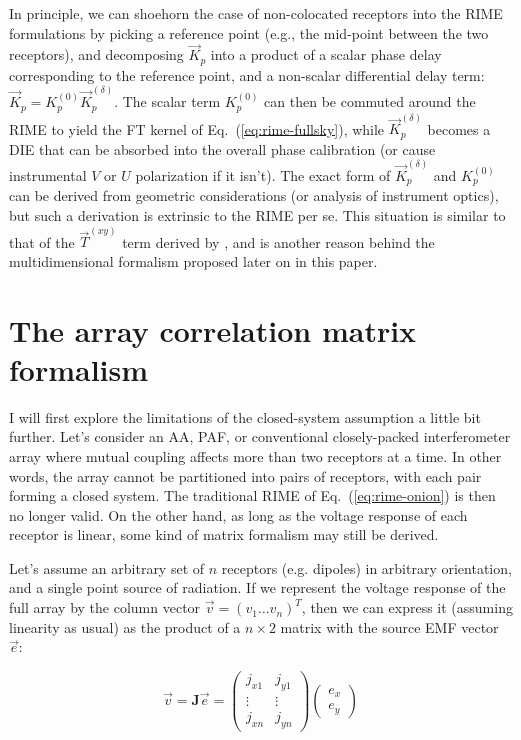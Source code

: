 \documentclass{aa}
\newcommand{\jones}[2]{\vec {#1}_{#2}}
\begin{document}
In principle, we can shoehorn the case of non-colocated receptors into the RIME formulations by picking a reference point (e.g., the  mid-point between the two receptors), and decomposing $\jones{K}{p}$ into a product of a scalar phase delay corresponding to the reference point, and a non-scalar differential delay term: $\jones{K}{p}=K_p^{(0)}\jones{K}{p}^{(\delta)}.$ The scalar term $K_p^{(0)}$ can then be commuted around the RIME to yield the FT kernel of Eq.~(\ref{eq:rime-fullsky}), while $\jones{K}{p}^{(\delta)}$ becomes a DIE that can be absorbed into the overall phase calibration (or cause instrumental $V$ or $U$ polarization if it isn't). The exact form of $\jones{K}{p}^{(\delta)}$ and $K_p^{(0)}$ can be derived from geometric considerations (or analysis of instrument optics), but such a derivation is extrinsic to the RIME per se. This situation is similar to that of the $\jones{T}{}^{(xy)}$ term derived by \citet{Carozzi:ME3D}, and is another reason behind the multidimensional formalism proposed later on in this paper.

\section{The array correlation matrix formalism}
\label{sec:matrix}

I will first explore the limitations of the closed-system assumption a little bit further. Let's consider an AA, PAF, or conventional closely-packed interferometer array where mutual coupling affects more than two receptors at a time. In other words, the array cannot be partitioned into pairs of receptors, with each pair forming a closed system. The traditional RIME of Eq.~(\ref{eq:rime-onion}) is then no longer valid. On the other
hand, as long as the voltage response of each receptor is linear, some kind of matrix formalism may still be derived.

Let's assume an arbitrary set of $n$ receptors (e.g. dipoles) in arbitrary orientation, and a single point source of radiation. 
If we represent the voltage response of the full array by the column vector $\vec{v}=(v_{1}\ldots v_{n})^T$, then we can express it (assuming linearity as usual) as the product of a $n\times2$ matrix with the source EMF vector $\vec e$:

\[
\vec{v} = \mathbf{J}\vec e = \left(\begin{array}{cc}
j_{x1} & j_{y1}\\
\vdots & \vdots\\
j_{xn} & j_{yn}\end{array}\right)
\left(\begin{array}{c} e_x\\e_y
\end{array}\right)
\]
\end{document}
